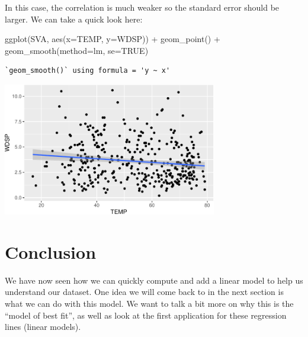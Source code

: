\documentclass[
  letterpaper,
  DIV=11,
  numbers=noendperiod]{scrreprt}
\newenvironment{Shaded}{\begin{snugshade}}{\end{snugshade}}
\newcommand{\AttributeTok}[1]{\textcolor[rgb]{0.40,0.45,0.13}{#1}}
\newcommand{\ConstantTok}[1]{\textcolor[rgb]{0.56,0.35,0.01}{#1}}
\newcommand{\FunctionTok}[1]{\textcolor[rgb]{0.28,0.35,0.67}{#1}}
\newcommand{\NormalTok}[1]{\textcolor[rgb]{0.00,0.23,0.31}{#1}}
\newcommand{\SpecialCharTok}[1]{\textcolor[rgb]{0.37,0.37,0.37}{#1}}
\newcommand{\StringTok}[1]{\textcolor[rgb]{0.13,0.47,0.30}{#1}}
\begin{document}
In this case, the correlation is much weaker so the standard error
should be larger. We can take a quick look here:

\begin{Shaded}
\begin{Highlighting}[]
\FunctionTok{ggplot}\NormalTok{(SVA, }\FunctionTok{aes}\NormalTok{(}\AttributeTok{x=}\NormalTok{TEMP, }\AttributeTok{y=}\NormalTok{WDSP)) }\SpecialCharTok{+}
  \FunctionTok{geom\_point}\NormalTok{() }\SpecialCharTok{+}
  \FunctionTok{geom\_smooth}\NormalTok{(}\AttributeTok{method=}\StringTok{\textquotesingle{}lm\textquotesingle{}}\NormalTok{, }\AttributeTok{se=}\ConstantTok{TRUE}\NormalTok{)}
\end{Highlighting}
\end{Shaded}

\begin{verbatim}
`geom_smooth()` using formula = 'y ~ x'
\end{verbatim}

\begin{center}
\includegraphics[width=0.7\textwidth,height=\textheight]{Linear_Modeling_and_Regression_files/figure-pdf/unnamed-chunk-15-1.pdf}
\end{center}

\section*{Conclusion}\label{conclusion-6}


We have now seen how we can quickly compute and add a linear model to
help us understand our dataset. One idea we will come back to in the
next section is what we can do with this model. We want to talk a bit
more on why this is the ``model of best fit'', as well as look at the
first application for these regression lines (linear models).
\end{document}
